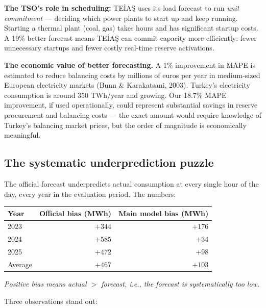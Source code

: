 \documentclass[11pt,a4paper]{article}
\begin{document}
\textbf{The TSO's role in scheduling:} TEİAŞ uses its load forecast to
run \emph{unit commitment} --- deciding which power plants to start up
and keep running. Starting a thermal plant (coal, gas) takes hours and
has significant startup costs. A 19\% better forecast means TEİAŞ can
commit capacity more efficiently: fewer unnecessary startups and fewer
costly real-time reserve activations.

\begin{keybox}
\textbf{The economic value of better forecasting.} A 1\% improvement
in MAPE is estimated to reduce balancing costs by millions of euros
per year in medium-sized European electricity markets (Bunn \&
Karakatsani, 2003). Turkey's electricity consumption is around
350 TWh/year and growing. Our 18.7\% MAPE improvement, if used
operationally, could represent substantial savings in reserve procurement
and balancing costs --- the exact amount would require knowledge of
Turkey's balancing market prices, but the order of magnitude is
economically meaningful.
\end{keybox}

\subsection{The systematic underprediction puzzle}

The official forecast underpredicts actual consumption at every single
hour of the day, every year in the evaluation period. The numbers:

\begin{center}
\begin{tabular}{lrr}
\toprule
Year & Official bias (MWh) & Main model bias (MWh) \\
\midrule
2023 & $+344$ & $+176$ \\
2024 & $+585$ & $+34$  \\
2025 & $+472$ & $+98$  \\
\midrule
Average & $+467$ & $+103$ \\
\bottomrule
\end{tabular}
\end{center}

\emph{Positive bias means actual $>$ forecast, i.e., the forecast
is systematically too low.}

Three observations stand out:
\end{document}
